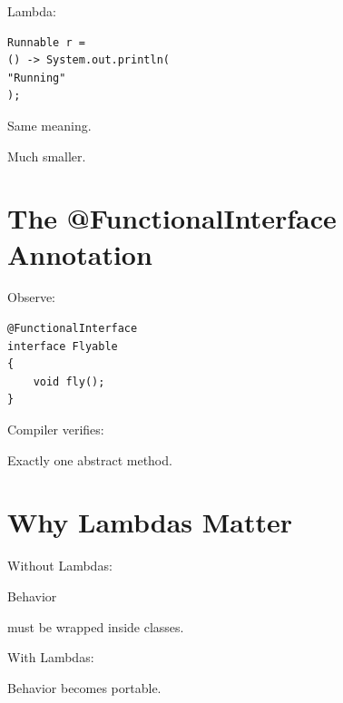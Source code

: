 \documentclass[11pt,a4paper]{book}
\begin{document}

Lambda:

\begin{verbatim} 
Runnable r =
() -> System.out.println(
"Running"
);
\end{verbatim}


Same meaning.


Much smaller.


\section{The @FunctionalInterface Annotation}

Observe:

\begin{verbatim} 
@FunctionalInterface
interface Flyable
{
    void fly();
}
\end{verbatim}


Compiler verifies:


Exactly one abstract method.


\section{Why Lambdas Matter}

Without Lambdas:


Behavior

must be wrapped inside
classes.


With Lambdas:


Behavior becomes portable.

\end{document}
